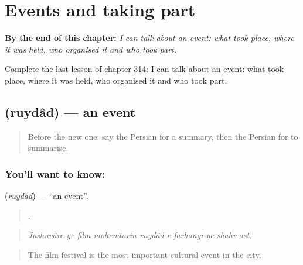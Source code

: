 
\chapter{Events and taking part}
\label{ch:fa-events-and-taking-part}

\begin{chapteropening}
\textbf{By the end of this chapter:} \emph{I can talk about an event: what took place, where it was held, who organised it and who took part.}

Complete the last lesson of chapter 314: I can talk about an event: what took place, where it was held, who organised it and who took part.
\end{chapteropening}

\section[\texorpdfstring{\fa{رویداد} (ruydâd)}{رویداد (ruydâd)}]{ (ruydâd) — an event}

\label{lesson:FA-C314-ruydad}



\begin{quote}
Before the new one: say the Persian for a summary, then the Persian for to summarise.
\end{quote}

\subsection*{You'll want to know: }
\textbf{} (\emph{ruydâd}) — \textquotedblleft{}an event\textquotedblright{}.

\begin{quote}
      .
\end{quote}

\begin{quote}
\emph{Jashnvâre-ye film mohemtarin ruydâd-e farhangi-ye shahr ast.}
\end{quote}

\begin{quote}
The film festival is the most important cultural event in the city.
\end{quote}

